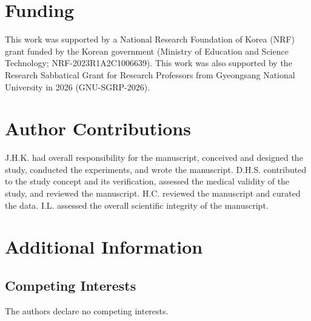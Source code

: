\section*{Funding}

This work was supported by a National Research Foundation of Korea (NRF) grant funded by
the Korean government (Ministry of Education and Science Technology;
NRF-2023R1A2C1006639). This work was also supported by the Research Sabbatical Grant for
Research Professors from Gyeongsang National University in 2026 (GNU-SGRP-2026).

\section*{Author Contributions}

J.H.K. had overall responsibility for the manuscript, conceived and designed the study,
conducted the experiments, and wrote the manuscript. D.H.S. contributed to the study concept
and its verification, assessed the medical validity of the study, and reviewed the manuscript.
H.C. reviewed the manuscript and curated the data. I.L. assessed the overall scientific
integrity of the manuscript.

\section*{Additional Information}

\subsection*{Competing Interests}

The authors declare no competing interests.
